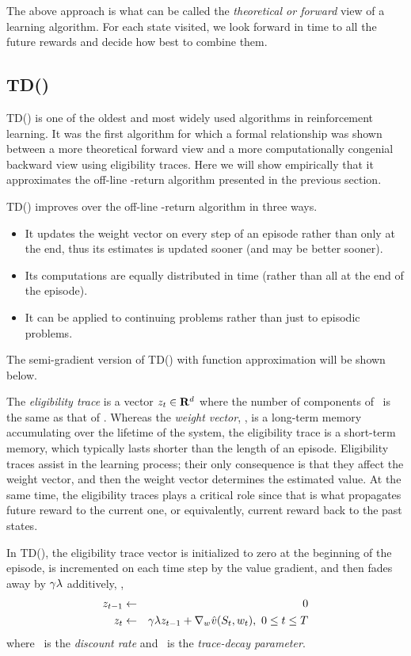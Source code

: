 The above approach is what can be called the \emph{theoretical or forward} view of a learning algorithm.
For each state visited, we look forward in time to all the future rewards and decide how best to combine them.

\subsection{TD(\tdparam)}

TD(\tdparam) is one of the oldest and most widely used algorithms in reinforcement learning.
It was the first algorithm for which a formal relationship was shown between a more theoretical forward view
and a more computationally congenial backward view using eligibility traces.
Here we will show empirically that it approximates the off-line \tdparam-return algorithm
presented in the previous section.

TD(\tdparam) improves over the off-line \tdparam-return algorithm in three ways.
\begin{itemize}
\item It updates the weight vector on every step of an episode rather than only at the end,
thus its estimates is updated sooner (and may be better sooner).
\item Its computations are equally distributed in time
(rather than all at the end of the episode).
\item It can be applied to continuing problems rather than just to episodic problems.
\end{itemize}
The semi-gradient version of TD(\tdparam) with function approximation
will be shown below.

The \emph{eligibility trace} is a vector $z_{t} \in \mathbf{R}^d$
where the number of components of \ is the same as that of .
Whereas the \emph{weight vector}, , is a long-term memory
accumulating over the lifetime of the system,
the eligibility trace is a short-term memory,
which typically lasts shorter than the length of an episode.
Eligibility traces assist in the learning process;
their only consequence is that they affect the weight vector,
and then the weight vector determines the estimated value.
At the same time, the eligibility traces plays a critical role
since that is what propagates future reward to the current one,
or equivalently, current reward back to the past states.

In TD(\tdparam),
the eligibility trace vector is initialized to zero at the beginning of the episode,
is incremented on each time step by the value gradient,
and then fades away by $\gamma \lambda$
additively,
\ie,
\begin{eqnarray}
\nonumber
z_{t-1} &\leftarrow& 0
\\
z_{t} &\leftarrow& \gamma \lambda z_{t-1} + \nabla_{{w_{}}} \hat{v}(S_{t}, {w_{t}}),
\ 0 \leq t \leq T
\label{eq:et:et-update}
\end{eqnarray}
where \df\ is the \emph{discount rate} and \tdparam\ is the \emph{trace-decay parameter}.

